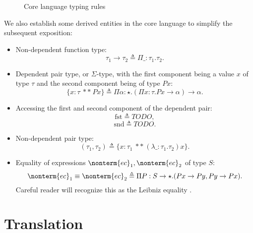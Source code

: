 \documentclass[a4paper]{article}
\begin{document}
\begin{figure}[ht]
  \footnotesize
  \caption{Core language typing rules}
  \label{fig:core_typing}
\end{figure}

We also establish some derived entities in the core language to simplify the subsequent exposition:

\begin{itemize}
  \item Non-dependent function type:
    \[
      \tau_1 \rightarrow \tau_2 \triangleq \Pi \_ : \tau_1. \tau_2.
    \]
  \item Dependent pair type, or $\Sigma$-type, with the first component being a value $x$ of type $\tau$ and the second component being of type $P x$:
    \[
      \{ x : \tau\ **\ P x \} \triangleq \Pi \alpha : \star. (\Pi x : \tau. P x \rightarrow \alpha) \rightarrow \alpha.
    \]
  \item Accessing the first and second component of the dependent pair:
    \[
      \text{fst} \triangleq TODO,
    \]
    \[
      \text{snd} \triangleq TODO.
    \]
  \item Non-dependent pair type:
    \[
      (\tau_1, \tau_2) \triangleq \{ x : \tau_1\ **\ (\lambda \_ : \tau_1. \tau_2) x \}.
    \]
  \item Equality of expressions $\nonterm{ec}_1, \nonterm{ec}_2$ of type $S$:
    \[
      \nonterm{ec}_1 \equiv \nonterm{ec}_2 \triangleq \Pi P : S \rightarrow \star. (P x \rightarrow P y, P y \rightarrow P x).
    \]
    Careful reader will recognize this as the Leibniz equality \cite{FindSomethingForThis}.
\end{itemize}

\section{Translation}
\end{document}
